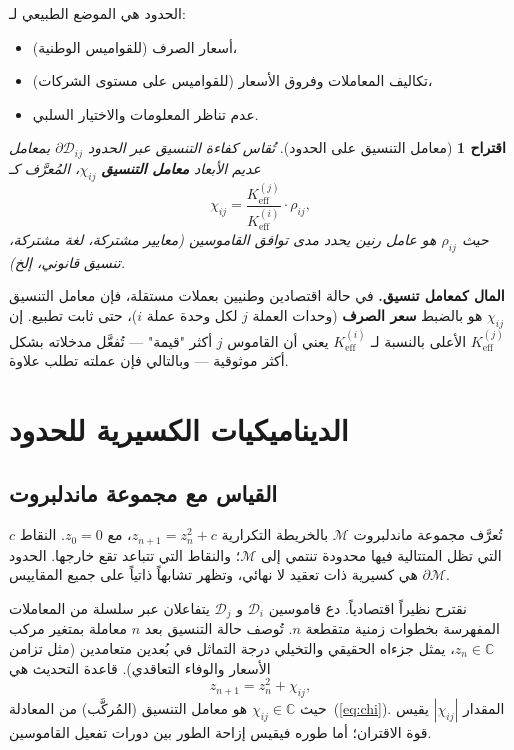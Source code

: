 \documentclass[12pt,a4paper]{article}
\newtheorem{proposition}[theorem]{اقتراح}
\theoremstyle{remark}
\begin{document}
	الحدود هي الموضع الطبيعي لـ:
	\begin{itemize}
		\item أسعار الصرف (للقواميس الوطنية)،
		\item تكاليف المعاملات وفروق الأسعار (للقواميس على مستوى الشركات)،
		\item عدم تناظر المعلومات والاختيار السلبي.
	\end{itemize}
	
	\begin{proposition}[معامل التنسيق على الحدود]
		تُقاس كفاءة التنسيق عبر الحدود \(\partial\mathcal{D}_{ij}\) بمعامل عديم الأبعاد \textbf{معامل التنسيق} \(\chi_{ij}\)، المُعرَّف كـ
		\begin{equation}
			\chi_{ij} = \frac{K_{\mathrm{eff}}^{(j)}}{K_{\mathrm{eff}}^{(i)}} \cdot \rho_{ij},
			\label{eq:chi}
		\end{equation}
		حيث \(\rho_{ij}\) هو عامل رنين يحدد مدى توافق القاموسين (معايير مشتركة، لغة مشتركة، تنسيق قانوني، إلخ).
	\end{proposition}
	
	\textbf{المال كمعامل تنسيق.} في حالة اقتصادين وطنيين بعملات مستقلة، فإن معامل التنسيق \(\chi_{ij}\) هو بالضبط \textbf{سعر الصرف} (وحدات العملة \(j\) لكل وحدة عملة \(i\))، حتى ثابت تطبيع. إن \(K_{\mathrm{eff}}^{(j)}\) الأعلى بالنسبة لـ \(K_{\mathrm{eff}}^{(i)}\) يعني أن القاموس \(j\) أكثر "قيمة" — تُفعَّل مدخلاته بشكل أكثر موثوقية — وبالتالي فإن عملته تطلب علاوة.
	
	\section{الديناميكيات الكسيرية للحدود}
	
	\subsection{القياس مع مجموعة ماندلبروت}
	
	تُعرَّف مجموعة ماندلبروت \(\mathcal{M}\) بالخريطة التكرارية \(z_{n+1} = z_n^2 + c\)، مع \(z_0 = 0\). النقاط \(c\) التي تظل المتتالية فيها محدودة تنتمي إلى \(\mathcal{M}\)؛ والنقاط التي تتباعد تقع خارجها. الحدود \(\partial\mathcal{M}\) هي كسيرية ذات تعقيد لا نهائي، وتظهر تشابهاً ذاتياً على جميع المقاييس.
	
	نقترح نظيراً اقتصادياً. دع قاموسين \(\mathcal{D}_i\) و \(\mathcal{D}_j\) يتفاعلان عبر سلسلة من المعاملات المفهرسة بخطوات زمنية متقطعة \(n\). تُوصف حالة التنسيق بعد \(n\) معاملة بمتغير مركب \(z_n \in \mathbb{C}\)، يمثل جزءاه الحقيقي والتخيلي درجة التماثل في بُعدين متعامدين (مثل تزامن الأسعار والوفاء التعاقدي). قاعدة التحديث هي
	\begin{equation}
		z_{n+1} = z_n^2 + \chi_{ij},
		\label{eq:mandel_econ}
	\end{equation}
	حيث \(\chi_{ij} \in \mathbb{C}\) هو معامل التنسيق (المُركَّب) من المعادلة~(\ref{eq:chi}). المقدار \(|\chi_{ij}|\) يقيس قوة الاقتران؛ أما طوره فيقيس إزاحة الطور بين دورات تفعيل القاموسين.
	
\end{document}
